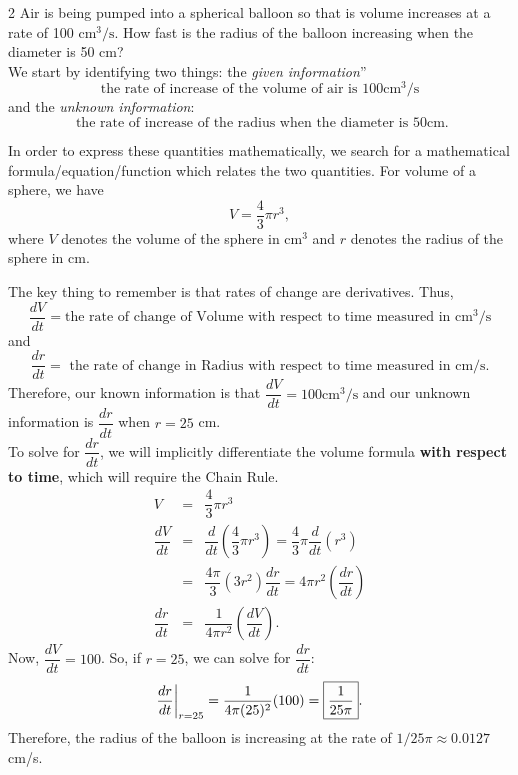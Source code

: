 \documentclass{book}
\begin{document}
\begin{Exam} 
\begin{multicols}{2}
Air is being pumped into a spherical balloon so that is volume increases at a rate of 100 $\mbox{cm}^3/\mbox{s}$. How fast is the radius of the balloon increasing when the diameter is 50 cm?\\

We start by identifying two things: the \emph{given information}'' \[\mbox{the rate of increase of the volume of air is } 100 \mbox{cm}^3/\mbox{s}\] and the \emph{unknown information}: \[\mbox{ the rate of increase of the radius when the diameter is } 50 \mbox{cm}.\] 

\begin{center}
\end{center}
\end{multicols}

In order to express these quantities mathematically, we search for a mathematical formula/equation/function which relates the two quantities.  For volume of a sphere, we have \[V = \frac{4}{3}\pi r^3,\] where $V$ denotes the volume of the sphere in $\mbox{cm}^3$ and $r$ denotes the radius of the sphere in $\mbox{cm}$. 

The key thing to remember is that rates of change are derivatives. Thus, \[\dfrac{dV}{dt} = \mbox{the rate of change of Volume with respect to time measured in } \mbox{cm}^3/\mbox{s}\] and \[\dfrac{dr}{dt} = \mbox{ the rate of  change in Radius with respect to time measured in cm/s.}\] Therefore, our known information is that $\dfrac{dV}{dt} = 100 \mbox{cm}^3/\mbox{s}$ and our unknown information is $\dfrac{dr}{dt}$ when $r = 25$ cm.\\

To solve for $\dfrac{dr}{dt}$, we will implicitly differentiate the volume formula \textbf{with respect to time}, which will require the Chain Rule. 
\begin{eqnarray*}
V &=& \dfrac{4}{3}\pi r^3\\
\dfrac{dV}{dt} &=& \dfrac{d}{dt}\left(\dfrac{4}{3}\pi r^3\right) = \dfrac{4}{3}\pi\dfrac{d}{dt}\left( r^3\right) \\
&=& \dfrac{4\pi}{3}(3r^2)\dfrac{dr}{dt} = 4\pi r^2\left(\dfrac{dr}{dt}\right)\\
\dfrac{dr}{dt} &=& \dfrac{1}{4\pi r^2}\left(\dfrac{dV}{dt}\right).
\end{eqnarray*} Now, $\dfrac{dV}{dt} = 100$. So, if $r  = 25$, we can solve for $\dfrac{dr}{dt}$: \[\dfrac{dr}{dt}\bigg|_{r=25} = \dfrac{1}{4\pi (25)^2}(100) = \fbox{$\dfrac{1}{25\pi}$}.\] Therefore, the radius of the balloon is increasing at the rate of $1/25\pi \approx 0.0127$ cm/s. 
\end{Exam}\vs
\end{document}
